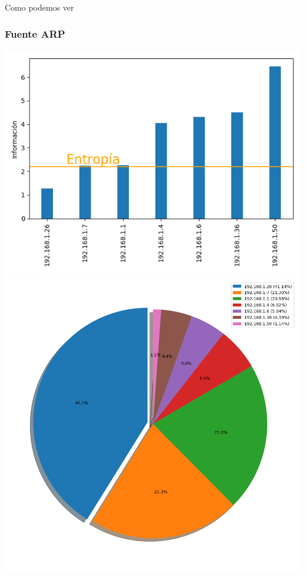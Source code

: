 Como podemos ver 
\subsubsection{Fuente ARP}

\hspace*{-1.5cm}
 \includegraphics[scale=0.6]{../plots/mauro_s2_informacion.png}
 \includegraphics[scale=0.4]{../plots/mauro_s2_probabilidades.png}

